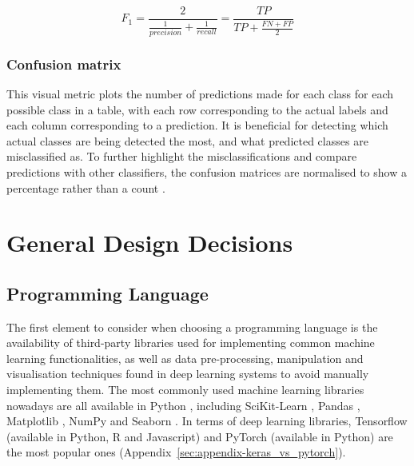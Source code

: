 \begin{equation}
\label{eq:f1-score}
    F_{1} = \frac{2}{\frac{1}{precision} + \frac{1}{recall}} = \frac{TP}{TP+\frac{FN + FP}{2}}
\end{equation}

\subsubsection{Confusion matrix} 

This visual metric plots the number of predictions made for each class for each possible class in a table, with each row corresponding to the actual labels and each column corresponding to a prediction. It is beneficial for detecting which actual classes are being detected the most, and what predicted classes are misclassified as. To further highlight the misclassifications and compare predictions with other classifiers, the confusion matrices are normalised to show a percentage rather than a count \citep{Geron2019}.


\section{General Design Decisions}

\subsection{Programming Language}


The first element to consider when choosing a programming language is the availability of third-party libraries used for implementing common machine learning functionalities, as well as data pre-processing, manipulation and visualisation techniques found in deep learning systems to avoid manually implementing them. The most commonly used machine learning libraries nowadays are all available in Python \citep{raschka2017python}, including SciKit-Learn \citep{scikit-learn}, Pandas \citep{reback2020pandas}, Matplotlib \citep{Hunter:2007}, NumPy \citep{numpy} and Seaborn \citep{seaborn}. In terms of deep learning libraries, Tensorflow (available in Python, R and Javascript) and PyTorch (available in Python) are  the most popular ones (Appendix~\ref{sec:appendix-keras_vs_pytorch}).\\

